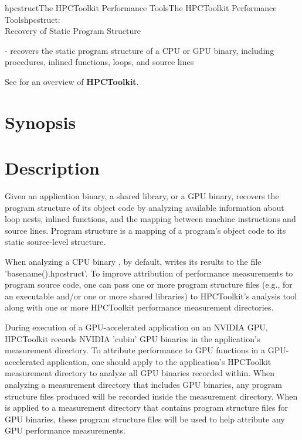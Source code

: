 \documentclass[english]{article}
\begin{document}
\begin{Name}{1}{hpcstruct}{The HPCToolkit Performance Tools}{The HPCToolkit Performance Tools}{hpcstruct:\\ Recovery of Static Program Structure}

 - recovers the static program structure of a CPU or GPU binary, including procedures, inlined functions, loops, and source lines

See  for an overview of \textbf{HPCToolkit}.

\end{Name}

\section{Synopsis}

  

  

\section{Description}

Given an application binary, a shared library, or a GPU binary, 
recovers the program structure of its object code by analyzing available information
about loop nests, inlined functions, and the mapping between machine instructions and 
source lines.  Program structure is a
mapping of a program's object code to its static source-level structure.

When analyzing a CPU binary , by default, 
 writes its results to the file 'basename().hpcstruct'.
To improve attribution of performance measurements to program source code, one can
pass one or more program structure files (e.g., for an executable and/or 
one or more shared libraries) to HPCToolkit's analysis tool 
along with one or more HPCToolkit performance measurement directories.

During execution of a GPU-accelerated application on an NVIDIA GPU, HPCToolkit
records NVIDIA 'cubin' GPU binaries in the application's measurement directory.
To attribute performance to GPU functions in a GPU-accelerated application, one
should apply  to the application's HPCToolkit measurement directory to
analyze all GPU binaries recorded within. When analyzing a measurement directory
that includes GPU binaries, any program structure files produced will be recorded
inside the measurement directory. When  is applied to a measurement
directory that contains program structure files for GPU binaries, these program
structure files will be used to help attribute any GPU performance measurements.
\end{document}
